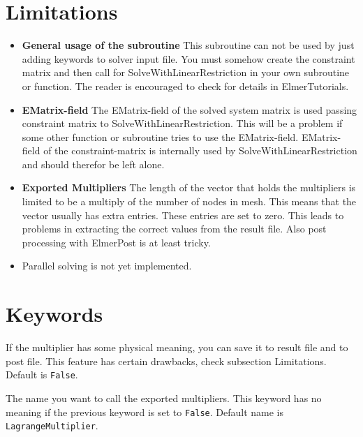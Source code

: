 \begin{versiona}
\section{Limitations}
\begin{itemize}
\item \textbf{General usage of the subroutine} \newline
This subroutine can not be used by just adding keywords to solver input file.
You must somehow create the constraint matrix and then call for SolveWithLinearRestriction
in your own subroutine or function. The reader is encouraged to check for details
in ElmerTutorials.

\item \textbf{EMatrix-field} \newline
The EMatrix-field of the solved system matrix is used passing constraint matrix to
SolveWithLinearRestriction. This will be a problem if some other function or subroutine
tries to use the EMatrix-field. EMatrix-field of the constraint-matrix is internally
used by SolveWithLinearRestriction and should therefor be left alone.

\item \textbf{Exported Multipliers} \newline
The length of the vector that holds the multipliers is limited to be a multiply
of the number of nodes in mesh. This means that the vector usually has extra entries.
These entries are set to zero. This leads to problems in extracting the correct 
values from the result file. Also post processing with ElmerPost is at least tricky.

\item Parallel solving is not yet implemented.

\end{itemize}

\section{Keywords}
\end{versiona}

\sifbegin
  \sifbegin
    If the multiplier has some physical meaning, you can save it to result file
    and to post file. This feature has certain drawbacks, check subsection Limitations.
    Default is {\tt False}.

    The name you want to call the exported multipliers. This keyword has no meaning if
    the previous keyword is set to {\tt False}. Default name is 
{\tt LagrangeMultiplier}.
  \sifend
\sifend

\begin{versiona}


\end{versiona}


